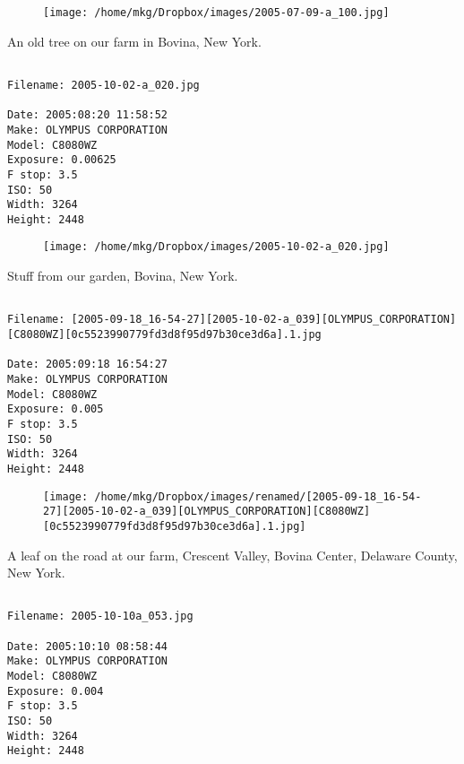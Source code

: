 \begin{figure}
\texttt{[image: /home/mkg/Dropbox/images/2005-07-09-a\_100.jpg]}
\end{figure}
    
\clearpage
\onecolumn
\noindent An old tree on our farm in Bovina, New York.
\noindent
\begin{lstlisting}

Filename: 2005-10-02-a_020.jpg

Date: 2005:08:20 11:58:52
Make: OLYMPUS CORPORATION
Model: C8080WZ
Exposure: 0.00625
F stop: 3.5
ISO: 50
Width: 3264
Height: 2448
\end{lstlisting}
\clearpage

\begin{figure}
\texttt{[image: /home/mkg/Dropbox/images/2005-10-02-a\_020.jpg]}
\end{figure}
    
\clearpage
\onecolumn
\noindent Stuff from our garden, Bovina, New York.
\noindent
\begin{lstlisting}

Filename: [2005-09-18_16-54-27][2005-10-02-a_039][OLYMPUS_CORPORATION][C8080WZ][0c5523990779fd3d8f95d97b30ce3d6a].1.jpg

Date: 2005:09:18 16:54:27
Make: OLYMPUS CORPORATION
Model: C8080WZ
Exposure: 0.005
F stop: 3.5
ISO: 50
Width: 3264
Height: 2448
\end{lstlisting}
\clearpage

\begin{figure}
\texttt{[image: /home/mkg/Dropbox/images/renamed/[2005-09-18\_16-54-27][2005-10-02-a\_039][OLYMPUS\_CORPORATION][C8080WZ][0c5523990779fd3d8f95d97b30ce3d6a].1.jpg]}
\end{figure}
    
\clearpage
\onecolumn
\noindent A leaf on the road at our farm, Crescent Valley, Bovina Center, Delaware County, New York.
\noindent
\begin{lstlisting}

Filename: 2005-10-10a_053.jpg

Date: 2005:10:10 08:58:44
Make: OLYMPUS CORPORATION
Model: C8080WZ
Exposure: 0.004
F stop: 3.5
ISO: 50
Width: 3264
Height: 2448
\end{lstlisting}
\clearpage

